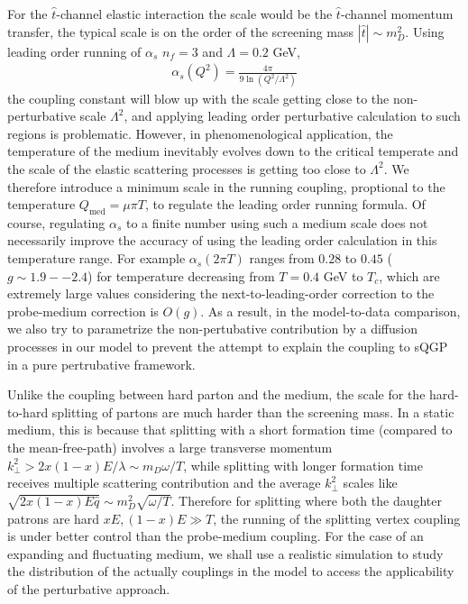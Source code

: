 For the $\hat{t}$-channel elastic interaction the scale would be the $\hat{t}$-channel momentum transfer, the typical scale is on the order of the screening mass $|\hat{t}| \sim m_D^2$.  
Using leading order running of $\alpha_s$ $n_f = 3$ and $\Lambda = 0.2$ GeV, 
\begin{eqnarray}
\alpha_s(Q^2) = \frac{4\pi}{9\ln\left(Q^2/\Lambda^2\right)}
\end{eqnarray}
the coupling constant will blow up with the scale getting close to the non-perturbative scale $\Lambda^2$, and applying leading order perturbative calculation to such regions is problematic. 
However, in phenomenological application, the temperature of the medium inevitably evolves down to the critical temperate and the scale of the elastic scattering processes is getting too close to $\Lambda^2$.
We therefore introduce a minimum scale in the running coupling, proptional to the temperature $Q_{\textrm{med}} = \mu \pi T$, to regulate the leading order running formula.
Of course, regulating $\alpha_s$ to a finite number using such a medium scale does not necessarily improve the accuracy of using the leading order  calculation in this temperature range. 
For example $\alpha_s(2\pi T)$ ranges from $0.28$ to $0.45$ ($g \sim 1.9 -- 2.4$) for temperature decreasing from $T=0.4$ GeV to $T_c$, which are extremely large values considering the next-to-leading-order correction to the probe-medium correction is $O(g)$.  
As a result, in the model-to-data comparison, we also try to parametrize the non-pertubative contribution by a diffusion processes in our model to prevent the attempt to explain the coupling to sQGP in a pure pertrubative framework.

Unlike the coupling between hard parton and the medium, the scale for the hard-to-hard splitting of partons are much harder than the screening mass.
In a static medium, this is because that splitting with a short formation time (compared to the mean-free-path) involves a large transverse momentum $k_\perp^2 > 2x(1-x)E /\lambda \sim m_D \omega/T$, while splitting with longer formation time receives multiple scattering contribution and the average $k_\perp^2$ scales like $\sqrt{2x(1-x)E\hat{q}} \sim m_D^2 \sqrt{\omega/T}$.
Therefore for splitting where both the daughter patrons are hard $xE, (1-x)E \gg T$, the running of the splitting vertex coupling is under better control than the probe-medium coupling.
For the case of an expanding and fluctuating medium, we shall use a realistic simulation to study the distribution of the actually couplings in the model to access the applicability of the perturbative approach.

